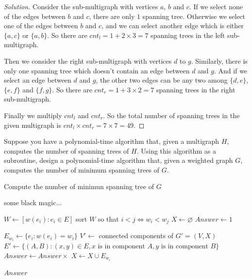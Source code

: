 \begin{proof}[Solution]
        Consider the sub-multigraph with vertices $a$, $b$ and $c$. If we select none of the edges between $b$ and $c$, there are only $1$ spanning tree. Otherwise we select one of the edges between $b$ and $c$, and we can select another edge which is either $\{a, c\}$ or $\{a, b\}$. So there are $cnt_l = 1 + 2 \times 3 = 7$ spanning trees in the left sub-multigraph.
        
        Then we consider the right sub-multigraph with vertices $d$ to $g$. Similarly, there is only one spanning tree which doesn't contain an edge between $d$ and $g$. And if we select an edge between $d$ and $g$, the other two edges can be any two among $\{d, e\}$, $\{e, f\}$ and $\{f, g\}$. So there are $cnt_r = 1 + 3 \times 2 = 7$ spanning trees in the right sub-multigraph.
        
        Finally we multiply $cnt_l$ and $cnt_r$. So the total number of spanning trees in the given multigraph is $cnt_l \times cnt_r = 7 \times 7 = 49$.
    \end{proof}
    
    \newpage
    
    \begin{thm}{}{}
        Suppose you have a polynomial-time algorithm that, given a multigraph $H$, computes the number of spanning trees of $H$. Using this algorithm as a subroutine, design a polynomial-time algorithm that, given a weighted graph $G$, computes the number of minimum spanning trees of $G$.
    \end{thm}
    
    \begin{algorithm}
        \caption{Compute the number of minimun spanning tree of $G$}
        \begin{algorithmic}
            
            some black magic...
            
            \EndFunction
            
            
            \State $W \gets [w(e_i): e_i \in E]$
            \State sort $W$ so that $i < j \iff w_i < w_j$
            \State $X \gets \varnothing$
            \State $Answer \gets 1$
            
            
            \State $E_{w_i} \gets \{e_i: w(e_i) = w_i\} $
            \State $V' \gets$ connected components of $G' = (V, X)$
            \State $E' \gets \{(A, B): (x, y) \in E, x \text{ is in component } A, y \text{ is in component } B\}$
            \State $Answer \gets Answer \times$ 
            \State $X \gets X \cup E_{w_i}$
            
            \EndFor
            
            \Return $Answer$
            
            \EndFunction
        \end{algorithmic}
        
    \end{algorithm}
    
